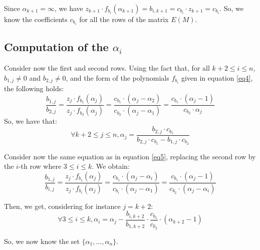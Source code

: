 \documentclass[12pt,a4paper,titlepage]{article}
\begin{document}
Since $\alpha_{k+1} = \infty$, we have $z_{k+1}\cdot f_{b_i}(\alpha_{k+1}) = b_{i,k+1} = c_{b_i}\cdot z_{k+1} = c_{b_i}$.
So, we know the coefficients $c_{b_i}$ for all the rows of the matrix $E(M)$.

\subsection{Computation of the $\alpha_i$}
Consider now the first and second rows. Using the fact that, for all $k+2\leq i\leq n$, $b_{1,j}\neq 0$ and $b_{2,j}\neq 0$, and the form of the polynomials $f_{b_i}$ given in equation \eqref{eq4}, the following holds:
\begin{equation}
\frac{b_{1,j}}{b_{2,j}} = \frac{z_j\cdot f_{b_1}(\alpha_j)}{z_j\cdot f_{b_2}(\alpha_j)} = \frac{c_{b_1}\cdot (\alpha_j - \alpha_2)}{c_{b_2}\cdot (\alpha_j - \alpha_1)} = \frac{c_{b_1}\cdot (\alpha_j - 1)}{c_{b_2}\cdot \alpha_j}
\label{eq5}
\end{equation}
So, we have that:
\begin{equation}
\forall k+2\leq j\leq n, \alpha_j = \frac{b_{2,j}\cdot c_{b_1}}{b_{2,j}\cdot c_{b_1} - b_{1,j}\cdot c_{b_2}}
\label{eq6}
\end{equation}

Consider now the same equation as in equation \eqref{eq5}, replacing the second row by the $i$-th row where $3\leq i\leq k$. We obtain:
\begin{equation}
\frac{b_{1,j}}{b_{i,j}} = \frac{z_j\cdot f_{b_1}(\alpha_j)}{z_j\cdot f_{b_i}(\alpha_j)} = \frac{c_{b_1}\cdot (\alpha_j - \alpha_i)}{c_{b_i}\cdot (\alpha_j - \alpha_1)} = \frac{c_{b_1}\cdot (\alpha_j - 1)}{c_{b_2}\cdot (\alpha_j - \alpha_i)}
\label{eq7}
\end{equation}

Then, we get, considering for instance $j=k+2$:
\begin{equation}
\forall 3\leq i\leq k, \alpha_i = \alpha_j - \frac{b_{i,k+2}}{b_{1,k+2}}\cdot \frac{c_{b_1}}{c_{b_2}}\cdot (\alpha_{k+2}-1)
\label{eq8}
\end{equation}

So, we now know the set $\{\alpha_1,... ,\alpha_n\}$.
\end{document}
